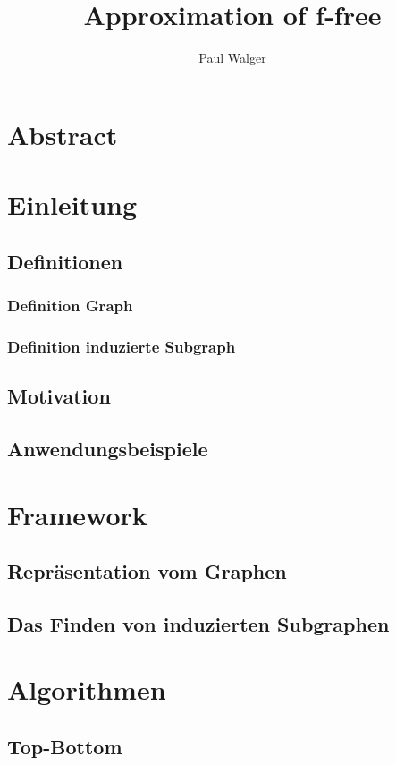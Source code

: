 \documentclass[12pt,a4paper,onecolumn,oneside,titlepage]{article}
\author{Paul Walger}
\title{Approximation of f-free}
\begin{document}
\maketitle
\tableofcontents
\newpage

\section{Abstract}

\section{Einleitung}
\subsection{Definitionen}
\subsubsection{Definition Graph}
\subsubsection{Definition induzierte Subgraph}

\subsection{Motivation}
\subsection{Anwendungsbeispiele}

\section{Framework}
\subsection{Repräsentation vom Graphen}
\subsection{Das Finden von induzierten Subgraphen}

\section{Algorithmen}
\subsection{Top-Bottom}
\end{document}
